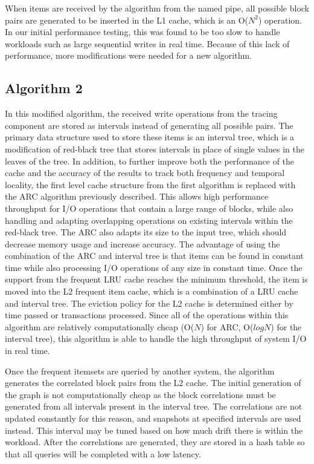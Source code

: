 \documentclass[MEng]{uofl}
\begin{document}
When items are received by the algorithm from the named pipe, all possible block pairs are generated to be inserted in the L1 cache, which is an O($N^2$) operation. In our initial performance testing, this was found to be too slow to handle workloads such as large sequential writes in real time. Because of this lack of performance, more modifications were needed for a new algorithm.

\subsection{Algorithm 2}
In this modified algorithm, the received write operations from the tracing component are stored as intervals instead of generating all possible pairs. The primary data structure used to store these items is an interval tree, which is a modification of red-black tree that stores intervals in place of single values in the leaves of the tree. In addition, to further improve both the performance of the cache and the accuracy of the results to track both frequency and temporal locality, the first level cache structure from the first algorithm is replaced with the ARC algorithm previously described. This allows high performance throughput for I/O operations that contain a large range of blocks, while also handling and adapting overlapping operations on existing intervals within the red-black tree. The ARC also adapts its size to the input tree, which should decrease memory usage and increase accuracy. The advantage of using the combination of the ARC and interval tree is that items can be found in constant time while also processing I/O operations of any size in constant time. Once the support from the frequent LRU cache reaches the minimum threshold, the item is moved into the L2 frequent item cache, which is a combination of a LRU cache and interval tree. The eviction policy for the L2 cache is determined either by time passed or transactions processed. Since all of the operations within this algorithm are relatively computationally cheap (O($N$) for ARC, O($log N$) for the interval tree), this algorithm is able to handle the high throughput of system I/O in real time. 

Once the frequent itemsets are queried by another system, the algorithm generates the correlated block pairs from the L2 cache. The initial generation of the graph is not computationally cheap as the block correlations must be generated from all intervals present in the interval tree. The correlations are not updated constantly for this reason, and snapshots at specified intervals are used instead. This interval may be tuned based on how much drift there is within the workload. After the correlations are generated, they are stored in a hash table so that all queries will be completed with a low latency. 
\end{document}
